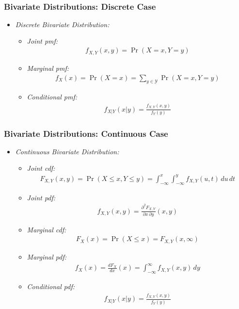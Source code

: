 

\begin{frame}
\frametitle{Bivariate Distributions: Discrete Case}
\begin{itemize}
\item \emph{Discrete Bivariate Distribution:}
\begin{itemize}
\item \emph{Joint pmf:}
\begin{align*}
f_{X,Y}(x,y) = \Pr(X=x, Y=y)
\end{align*}
\item \emph{Marginal pmf:}
\begin{align*}
f_X(x) = \Pr(X=x) = \sum_{y\in\mathcal{Y}} \Pr(X=x,Y=y)
\end{align*}
\item \emph{Conditional pmf:}
\begin{align*}
f_{X|Y}(x|y) = \frac{f_{X,Y}(x,y)}{f_Y(y)}
\end{align*}
\end{itemize}
\end{itemize}
\end{frame}


\begin{frame}
\frametitle{Bivariate Distributions: Continuous Case}
\begin{itemize}
\item \emph{Continuous Bivariate Distribution:}
\begin{itemize}
\item \emph{Joint cdf:}
\begin{align*}
F_{X,Y}(x,y) 
  = \Pr(X \leq x, Y \leq y) 
  = \int_{-\infty}^x \int_{-\infty}^y f_{X,Y}(u,t)\,du\,dt
\end{align*}
\item \emph{Joint pdf:}
\begin{align*}
f_{X,Y}(x,y) 
  = \frac{\partial^2 F_{X,Y}}{\partial x \,\partial y}(x,y)
\end{align*}
\item \emph{Marginal cdf:}
\begin{align*}
F_X(x) = \Pr(X \leq x) = F_{X,Y}(x,\infty)
\end{align*}
\item \emph{Marginal pdf:}
\begin{align*}
f_X(x) 
  = \frac{d F_X}{dx}(x) 
  = \int_{-\infty}^\infty f_{X,Y}(x,y)\,dy
\end{align*}
\item \emph{Conditional pdf:}
\begin{align*}
f_{X|Y}(x|y) = \frac{f_{X,Y}(x,y)}{f_Y(y)}
\end{align*}
\end{itemize}
\end{itemize}
\end{frame}


